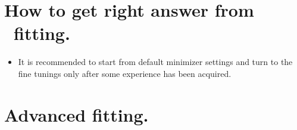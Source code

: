 

%
\section {How to get right answer from \BornAgain\ fitting.} 

\begin{itemize}
\item It is recommended to start from default minimizer settings and turn to the fine tunings
only after some experience has been acquired.

\end{itemize}

% 
\section {Advanced fitting.} 





%
%


